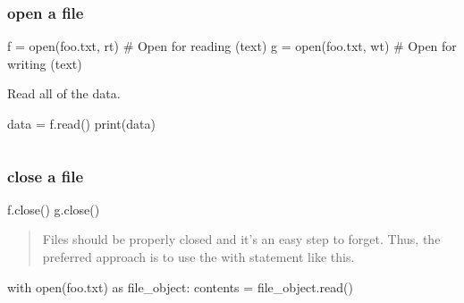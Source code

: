 \documentclass[
  letterpaper,
  DIV=11,
  numbers=noendperiod]{scrreprt}
\newenvironment{Shaded}{\begin{snugshade}}{\end{snugshade}}
\newcommand{\BuiltInTok}[1]{\textcolor[rgb]{0.00,0.46,0.62}{#1}}
\newcommand{\BuiltInTok}[1]{\textcolor[rgb]{0.00,0.48,0.65}{#1}}
\newcommand{\CommentTok}[1]{\textcolor[rgb]{0.37,0.37,0.37}{#1}}
\newcommand{\ControlFlowTok}[1]{\textcolor[rgb]{0.00,0.46,0.62}{#1}}
\newcommand{\ControlFlowTok}[1]{\textcolor[rgb]{0.00,0.48,0.65}{#1}}
\newcommand{\ImportTok}[1]{\textcolor[rgb]{0.00,0.46,0.62}{#1}}
\newcommand{\NormalTok}[1]{\textcolor[rgb]{0.00,0.46,0.62}{#1}}
\newcommand{\OperatorTok}[1]{\textcolor[rgb]{0.37,0.37,0.37}{#1}}
\newcommand{\ImportTok}[1]{\textcolor[rgb]{0.00,0.48,0.65}{#1}}
\newcommand{\NormalTok}[1]{\textcolor[rgb]{0.00,0.48,0.65}{#1}}
\newcommand{\OperatorTok}[1]{\textcolor[rgb]{0.37,0.37,0.37}{#1}}
\newcommand{\StringTok}[1]{\textcolor[rgb]{0.13,0.47,0.30}{#1}}
\begin{document}
\begin{Shaded}
\begin{Highlighting}[]
\hypertarget{open-a-file}{%
\subsubsection{open a file}\label{open-a-file}}

\begin{Shaded}
\begin{Highlighting}[]
\NormalTok{f }\OperatorTok{=} \BuiltInTok{open}\NormalTok{(}\StringTok{\textquotesingle{}foo.txt\textquotesingle{}}\NormalTok{, }\StringTok{\textquotesingle{}rt\textquotesingle{}}\NormalTok{)     }\CommentTok{\# Open for reading (text)}
\NormalTok{g }\OperatorTok{=} \BuiltInTok{open}\NormalTok{(}\StringTok{\textquotesingle{}foo.txt\textquotesingle{}}\NormalTok{, }\StringTok{\textquotesingle{}wt\textquotesingle{}}\NormalTok{)     }\CommentTok{\# Open for writing (text)}
\end{Highlighting}
\end{Shaded}

Read all of the data.

\begin{Shaded}
\begin{Highlighting}[]
\NormalTok{data }\OperatorTok{=}\NormalTok{ f.read()}
\BuiltInTok{print}\NormalTok{(data)}
\end{Highlighting}
\end{Shaded}

\begin{verbatim}
\end{verbatim}

\hypertarget{close-a-file}{%
\subsubsection{close a file}\label{close-a-file}}

\begin{Shaded}
\begin{Highlighting}[]
\NormalTok{f.close()}
\NormalTok{g.close()}
\end{Highlighting}
\end{Shaded}

\begin{quote}
Files should be properly closed and it's an easy step to forget. Thus,
the preferred approach is to use the with statement like this.
\end{quote}

\begin{Shaded}
\begin{Highlighting}[]
\ControlFlowTok{with} \BuiltInTok{open}\NormalTok{(}\StringTok{\textquotesingle{}foo.txt\textquotesingle{}}\NormalTok{) }\ImportTok{as}\NormalTok{ file\_object:}
\NormalTok{    contents }\OperatorTok{=}\NormalTok{ file\_object.read()}


\end{Highlighting}
\end{Shaded}
\end{Highlighting}
\end{Shaded}
\end{document}
